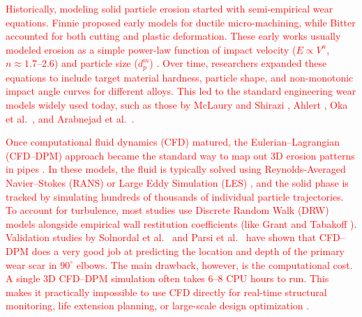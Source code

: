 \documentclass{article}
\begin{document}
\textcolor{red}{Historically, modeling solid particle erosion started with semi-empirical wear equations. Finnie \cite{finnie1960erosion} proposed early models for ductile micro-machining, while Bitter \cite{bitter1963} accounted for both cutting and plastic deformation. These early works usually modeled erosion as a simple power-law function of impact velocity ($E \propto V^n$, $n \approx 1.7$--$2.6$) and particle size ($d_p^m$) \cite{clark1992,elkholy1983prediction,desale2009}. Over time, researchers expanded these equations to include target material hardness, particle shape, and non-monotonic impact angle curves for different alloys. This led to the standard engineering wear models widely used today, such as those by McLaury and Shirazi \cite{mclaury1996,mclaury1999,chen2004cfd}, Ahlert \cite{ahlert1994}, Oka et al.~\cite{oka2005erosion1,oka2005erosion2}, and Arabnejad et al.~\cite{arabnejad2015}.}

\textcolor{red}{Once computational fluid dynamics (CFD) matured, the Eulerian--Lagrangian (CFD--DPM) approach became the standard way to map out 3D erosion patterns in pipes \cite{chen2004cfd,peng2016numerical,parsi2017cfd,singh2019modeling,wee2019cfd,wang2021experimental,mahmoudi2025erosion}. In these models, the fluid is typically solved using Reynolds-Averaged Navier--Stokes (RANS) or Large Eddy Simulation (LES) \cite{launder1972lectures}, and the solid phase is tracked by simulating hundreds of thousands of individual particle trajectories. To account for turbulence, most studies use Discrete Random Walk (DRW) models alongside empirical wall restitution coefficients (like Grant and Tabakoff \cite{grant1975}). Validation studies by Solnordal et al.~\cite{solnordal2015} and Parsi et al.~\cite{parsi2014review} have shown that CFD--DPM does a very good job at predicting the location and depth of the primary wear scar in $90^\circ$ elbows. The main drawback, however, is the computational cost. A single 3D CFD--DPM simulation often takes $6$--$8$ CPU hours to run. This makes it practically impossible to use CFD directly for real-time structural monitoring, life extension planning, or large-scale design optimization \cite{wang2022numerical,mondal2022burst}.}
\end{document}
